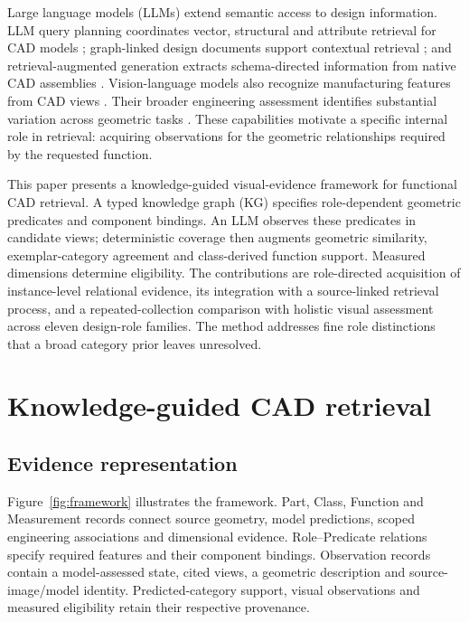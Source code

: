 \documentclass[10pt,a4paper,twocolumn]{article}
\begin{document}
Large language models (LLMs) extend semantic access to design information. LLM query planning coordinates vector, structural and attribute retrieval for CAD models \cite{lv2026cognitive}; graph-linked design documents support contextual retrieval \cite{theuner2025weaving}; and retrieval-augmented generation extracts schema-directed information from native CAD assemblies \cite{kurscheid2026extracting}. Vision-language models also recognize manufacturing features from CAD views \cite{khan2025leveraging}. Their broader engineering assessment identifies substantial variation across geometric tasks \cite{picard2025concept}. These capabilities motivate a specific internal role in retrieval: acquiring observations for the geometric relationships required by the requested function.

This paper presents a knowledge-guided visual-evidence framework for functional CAD retrieval. A typed knowledge graph (KG) specifies role-dependent geometric predicates and component bindings. An LLM observes these predicates in candidate views; deterministic coverage then augments geometric similarity, exemplar-category agreement and class-derived function support. Measured dimensions determine eligibility. The contributions are role-directed acquisition of instance-level relational evidence, its integration with a source-linked retrieval process, and a repeated-collection comparison with holistic visual assessment across eleven design-role families. The method addresses fine role distinctions that a broad category prior leaves unresolved.

\section{Knowledge-guided CAD retrieval}

\subsection{Evidence representation}

Figure~\ref{fig:framework} illustrates the framework. Part, Class, Function and Measurement records connect source geometry, model predictions, scoped engineering associations and dimensional evidence. Role--Predicate relations specify required features and their component bindings. Observation records contain a model-assessed state, cited views, a geometric description and source-image/model identity. Predicted-category support, visual observations and measured eligibility retain their respective provenance.
\end{document}

